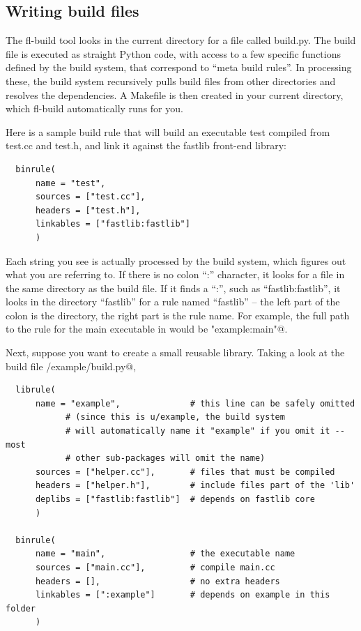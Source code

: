 \documentclass[letter]{report}
\begin{document}
\subsection{Writing build files}

The fl-build tool looks in the current directory for a file called build.py. The build file is executed as straight Python code, with access to a few specific functions defined by the build system, that correspond to ``meta build rules''. In processing these, the build system recursively pulls build files from other directories and resolves the dependencies. A Makefile is then created in your current directory, which fl-build automatically runs for you.

Here is a sample build rule that will build an executable test compiled from test.cc and test.h, and link it against the fastlib front-end library:
\begin{verbatim}
  binrule(
      name = "test",
      sources = ["test.cc"],
      headers = ["test.h"],
      linkables = ["fastlib:fastlib"]
      )
\end{verbatim}
Each string you see is actually processed by the build system, which figures out what you are referring to. If there is no colon ``:'' character, it looks for a file in the same directory as the build file. If it finds a ``:'', such as ``fastlib:fastlib'', it looks in the directory ``fastlib'' for a rule named ``fastlib'' -- the left part of the colon is the directory, the right part is the rule name. For example, the full path to the rule for the main executable in \verb@example@ would be \verb@"example:main"@.

Next, suppose you want to create a small reusable library. Taking a look at the build file \verb@u/example/build.py@,
\begin{verbatim}
  librule(
      name = "example",              # this line can be safely omitted
            # (since this is u/example, the build system
            # will automatically name it "example" if you omit it -- most
            # other sub-packages will omit the name)
      sources = ["helper.cc"],       # files that must be compiled
      headers = ["helper.h"],        # include files part of the 'lib'
      deplibs = ["fastlib:fastlib"]  # depends on fastlib core
      )

  binrule(
      name = "main",                 # the executable name
      sources = ["main.cc"],         # compile main.cc
      headers = [],                  # no extra headers
      linkables = [":example"]       # depends on example in this folder
      )
\end{verbatim}
\end{document}
